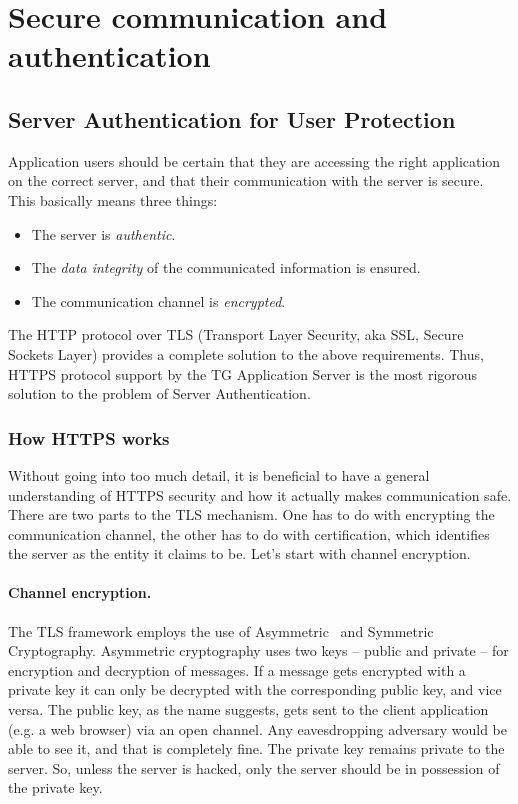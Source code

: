 \documentclass[a4paper,12pt,oneside,openright]{memoir}
\begin{document}
\section*{Secure communication and authentication}\label{sec:02}

\subsection*{Server Authentication for User Protection}

	Application users should be certain that they are accessing the right application on the correct server, and that their communication with the server is secure.
	This basically means three things:

	\begin{itemize}
	\item The server is \emph{authentic}.
	\item The \emph{data integrity} of the communicated information is ensured.
	\item The communication channel is \emph{encrypted}.
	\end{itemize}

	The HTTP protocol over TLS (Transport Layer Security, aka SSL, Secure Sockets Layer) provides a complete solution to the above requirements.
	Thus, HTTPS protocol support by the TG Application Server is the most rigorous solution to the problem of Server Authentication.

\subsubsection*{How HTTPS works}
	Without going into too much detail, it is beneficial to have a general understanding of HTTPS security and how it actually makes communication safe.
	There are two parts to the TLS mechanism.
	One has to do with encrypting the communication channel, the other has to do with certification, which identifies the server as the entity it claims to be. Let's start with channel encryption.

	\paragraph{Channel encryption.}
	The TLS framework employs the use of Asymmetric~\cite{PKC} and Symmetric~\cite{SKC} Cryptography.
	Asymmetric cryptography uses two keys -- public and private -- for encryption and decryption of messages.
	If a message gets encrypted with a private key it can only be decrypted with the corresponding public key, and vice versa.
	The public key, as the name suggests, gets sent to the client application (e.g. a web browser) via an open channel.
	Any eavesdropping adversary would be able to see it, and that is completely fine. The private key remains private to the server.
	So, unless the server is hacked, only the server should be in possession of the private key.
\end{document}
